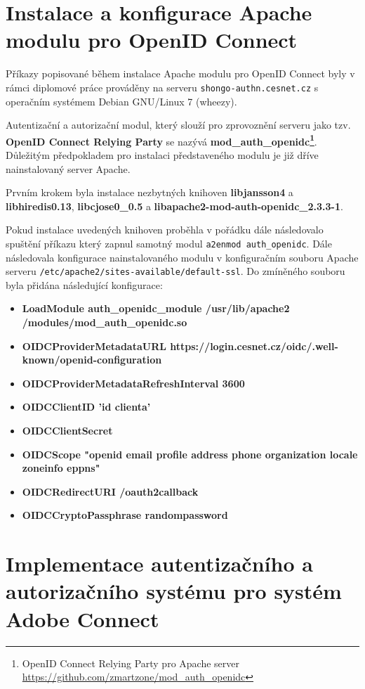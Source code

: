 \documentclass[
  printed, %
  twoside, %
  table,   %
  nolof,     %
  nolot,     %
]{fithesis3}
\begin{document}
\section{Instalace a konfigurace Apache modulu pro OpenID Connect}
\label{apacheConfig}
Příkazy popisované během instalace Apache modulu pro OpenID Connect byly v rámci diplomové práce prováděny na serveru \texttt{shongo-authn.cesnet.cz} s operačním systémem Debian GNU/Linux 7 (wheezy). 
\par 
Autentizační a autorizační modul, který slouží pro zprovoznění serveru jako tzv. \textbf{OpenID Connect Relying Party} se nazývá \textbf{mod\_auth\_openidc\footnote{OpenID Connect Relying Party pro Apache server \url{https://github.com/zmartzone/mod\_auth\_openidc}}}. Důležitým předpokladem pro instalaci představeného modulu je již dříve nainstalovaný server Apache. 
\par 
Prvním krokem byla instalace nezbytných knihoven \textbf{libjansson4} a \textbf{libhiredis0.13}, \textbf{libcjose0\_0.5} a \textbf{libapache2-mod-auth-openidc\_2.3.3-1}.
\par
Pokud instalace uvedených knihoven proběhla v pořádku dále následovalo spuštění příkazu který zapnul samotný modul \texttt{a2enmod auth\_openidc}. Dále následovala konfigurace nainstalovaného modulu v konfiguračním souboru Apache serveru \texttt{/etc/apache2/sites-available/default-ssl}. Do zmíněného souboru byla přidána následující konfigurace: 

\begin{itemize}
    \item \textbf{LoadModule auth\_openidc\_module /usr/lib/apache2\\ /modules/mod\_auth\_openidc.so}
    \item \textbf{OIDCProviderMetadataURL https://login.cesnet.cz/oidc/.well-known/openid-configuration}
    \item \textbf{OIDCProviderMetadataRefreshInterval 3600}
    \item \textbf{OIDCClientID 'id clienta'}
    \item \textbf{OIDCClientSecret}
    \item \textbf{OIDCScope "openid email profile address phone organization locale zoneinfo eppns"}
    \item \textbf{OIDCRedirectURI /oauth2callback}
    \item \textbf{OIDCCryptoPassphrase randompassword}
\end{itemize}

\section{Implementace autentizačního a autorizačního systému pro systém Adobe Connect}
\label{ACImpl}
\end{document}
